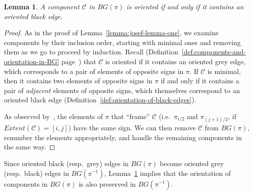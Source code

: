 \documentclass[review]{elsarticle}
\newtheorem{lemma}{Lemma}
\newcommand{\ie}{i.e.\ }
\newcommand{\resp}{resp.\ }
\begin{document}
\begin{lemma}\label{lemma:josef-lemma-two}
A component $\mathscr C$ in $BG(\pi)$ is oriented if and only if it contains an oriented black edge.
\end{lemma}
\begin{proof}
As in the proof of Lemma~\ref{lemma:josef-lemma-one}, we examine components by their inclusion order, starting with minimal ones and removing them as we go to proceed by induction. 
Recall (Definition~\ref{def:components-and-orientation-in-BG} page~\pageref{def:components-and-orientation-in-BG}) that $\mathscr C$ is oriented if it contains an oriented grey edge, which corresponds to a pair of elements of opposite signs in $\pi$. If $\mathscr C$ is minimal, then it contains two elements of opposite signs in $\pi$ if and only if it contains a pair of \emph{adjacent} elements of opposite signs, which themselves correspond to an oriented black edge (Definition~\ref{def:orientation-of-black-edges}). 

As observed by~\citet{bergeron-common}, the elements of $\pi$ that ``frame'' $\mathscr C$ (\ie $\pi_{i/2}$ and $\pi_{(j+1)/2}$, if $Extent(\mathscr C)=[i,j]$) have the same sign. We can then remove $\mathscr C$ from $BG(\pi)$, renumber the elements appropriately, and handle the remaining components in the same way.
\end{proof}

Since oriented black (\resp grey) edges in $BG(\pi)$ become oriented grey (\resp black) edges in $BG(\pi^{-1})$, Lemma~\ref{lemma:josef-lemma-two} implies that the orientation of components in $BG(\pi)$ is also preserved in $BG(\pi^{-1})$.
\end{document}
